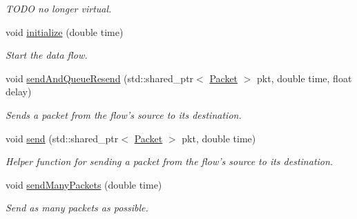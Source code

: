 \begin{DoxyCompactItemize}
\begin{DoxyCompactList}\small\item\em \-T\-O\-D\-O no longer virtual. \end{DoxyCompactList}\item 
void \hyperlink{classFlow_a1076308c9b3a11a1e0bdea4c7b4c2966}{initialize} (double time)
\begin{DoxyCompactList}\small\item\em \-Start the data flow. \end{DoxyCompactList}\item 
void \hyperlink{classFlow_a2a9cb972dfe6f6f03543073b575d65c6}{send\-And\-Queue\-Resend} (std\-::shared\-\_\-ptr$<$ \hyperlink{classPacket}{\-Packet} $>$ pkt, double time, float delay)
\begin{DoxyCompactList}\small\item\em \-Sends a packet from the flow's source to its destination. \end{DoxyCompactList}\item 
void \hyperlink{classFlow_a5a547ae4185337bf7790f9ace391ac48}{send} (std\-::shared\-\_\-ptr$<$ \hyperlink{classPacket}{\-Packet} $>$ pkt, double time)
\begin{DoxyCompactList}\small\item\em \-Helper function for sending a packet from the flow's source to its destination. \end{DoxyCompactList}\item 
void \hyperlink{classFlow_a792deb9bffc1a4020e09275f037fcc4c}{send\-Many\-Packets} (double time)
\begin{DoxyCompactList}\small\item\em \-Send as many packets as possible. \end{DoxyCompactList}\end{DoxyCompactItemize}
